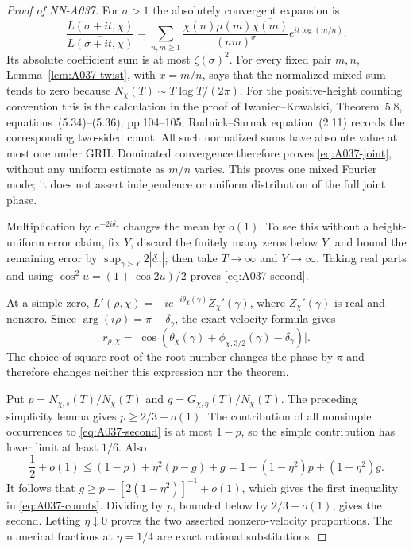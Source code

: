 \begin{proof}[Proof of NN-A037]
For $\sigma>1$ the absolutely convergent expansion is
\[
 \frac{L(\sigma+it,\chi)}{\overline{L(\sigma+it,\chi)}}
 =\sum_{n,m\ge1}
 \frac{\chi(n)\mu(m)\overline{\chi(m)}}{(nm)^\sigma}
       e^{it\log(m/n)}.
\]
Its absolute coefficient sum is at most $\zeta(\sigma)^2$.
For every fixed pair $m,n$, Lemma~\ref{lem:A037-twist}, with
$x=m/n$, says that the normalized mixed sum tends to zero because
$N_\chi(T)\sim T\log T/(2\pi)$. For the positive-height counting
convention this is the calculation in the proof of
Iwaniec--Kowalski, Theorem~5.8, equations~(5.34)--(5.36), pp.104--105;
Rudnick--Sarnak equation~(2.11) records the corresponding two-sided
count. All such normalized sums have
absolute value at most one under GRH. Dominated convergence therefore
proves \eqref{eq:A037-joint}, without any uniform estimate as $m/n$
varies. This proves one mixed Fourier mode; it does not assert
independence or uniform distribution of the full joint phase.

Multiplication by $e^{-2i\delta_\gamma}$ changes the mean by $o(1)$.
To see this without a height-uniform error claim, fix $Y$, discard the
finitely many zeros below $Y$, and bound the remaining error by
$\sup_{\gamma>Y}2|\delta_\gamma|$; then take $T\to\infty$ and
$Y\to\infty$. Taking real parts and using
$\cos^2 u=(1+\cos2u)/2$ proves \eqref{eq:A037-second}.

At a simple zero,
$L'(\rho,\chi)=-i e^{-i\theta_\chi(\gamma)}Z_\chi'(\gamma)$,
where $Z_\chi'(\gamma)$ is real and nonzero. Since
$\arg(i\rho)=\pi-\delta_\gamma$, the exact velocity formula gives
\[
 r_{\rho,\chi}
 =\big|\cos(\theta_\chi(\gamma)+
              \phi_{\chi,3/2}(\gamma)-\delta_\gamma)\big|.
\]
The choice of square root of the root number changes the phase by
$\pi$ and therefore changes neither this expression nor the theorem.

Put $p=N_{\chi,s}(T)/N_\chi(T)$ and
$g=G_{\chi,\eta}(T)/N_\chi(T)$. The preceding simplicity lemma
gives $p\ge2/3-o(1)$. The contribution of all nonsimple occurrences
to \eqref{eq:A037-second} is at most $1-p$, so the simple contribution
has lower limit at least $1/6$. Also
\[
 \frac12+o(1)
 \le(1-p)+\eta^2(p-g)+g
 =1-(1-\eta^2)p+(1-\eta^2)g.
\]
It follows that
$g\ge p-[2(1-\eta^2)]^{-1}+o(1)$, which gives the first inequality
in \eqref{eq:A037-counts}. Dividing by $p$, bounded below by
$2/3-o(1)$, gives the second. Letting $\eta\downarrow0$ proves the
two asserted nonzero-velocity proportions. The numerical fractions at
$\eta=1/4$ are exact rational substitutions.


\end{proof}

